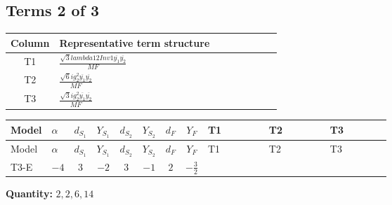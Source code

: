 \documentclass[8pt]{article}
\begin{document}
\begin{landscape}
\subsection*{Terms 2 of 3}
\begin{center}
\begin{tabular}{@{}c >{\raggedright\arraybackslash}p{0.82\linewidth}@{}}
\toprule
Column & Representative term structure \\
\midrule
T1 & \(\displaystyle \frac{\sqrt{3} lambda12Inv1 \overline{y_{1}} \overline{y_{2}}}{MF}\) \\
\midrule
T2 & \(\displaystyle \frac{\sqrt{6} i g_{2}^{2} \overline{y_{1}} \overline{y_{2}}}{MF}\) \\
\midrule
T3 & \(\displaystyle \frac{\sqrt{3} i g_{2}^{2} \overline{y_{1}} \overline{y_{2}}}{MF}\) \\
\midrule
\bottomrule
\end{tabular}
\end{center}
\smallskip
\tiny
\begin{longtable}{@{}llcccccc >{\raggedright\arraybackslash}p{0.21\linewidth} >{\raggedright\arraybackslash}p{0.21\linewidth} >{\raggedright\arraybackslash}p{0.21\linewidth}@{}}
\toprule
Model & $\alpha$ & $d_{S_1}$ & $Y_{S_1}$ & $d_{S_2}$ & $Y_{S_2}$ & $d_F$ & $Y_F$ & T1 & T2 & T3 \\
\midrule
\endfirsthead
\toprule
Model & $\alpha$ & $d_{S_1}$ & $Y_{S_1}$ & $d_{S_2}$ & $Y_{S_2}$ & $d_F$ & $Y_F$ & T1 & T2 & T3 \\
\midrule
\endhead
T3-E & $-4$ & $3$ & $-2$ & $3$ & $-1$ & $2$ & $-\frac{3}{2}$ & \scriptsize\adjustbox{max width=\linewidth}{$\begin{gathered} \frac{\sqrt{3} lambda12Inv1 \overline{y_{1}} \overline{y_{2}}}{6 MF}\end{gathered}$} & \scriptsize\adjustbox{max width=\linewidth}{$\begin{gathered} \frac{\sqrt{6} i g_{2}^{2} \overline{y_{1}} \overline{y_{2}}}{3 MF}\end{gathered}$} & \scriptsize\adjustbox{max width=\linewidth}{$\begin{gathered} \frac{\sqrt{3} i g_{2}^{2} \overline{y_{1}} \overline{y_{2}}}{6 MF}\end{gathered}$} \\
\midrule
\bottomrule
\end{longtable}
\clearpage
\noindent\textbf{Quantity: }$\mathrm{2,2,6,14}$\par\smallskip

\end{landscape}
\end{document}

